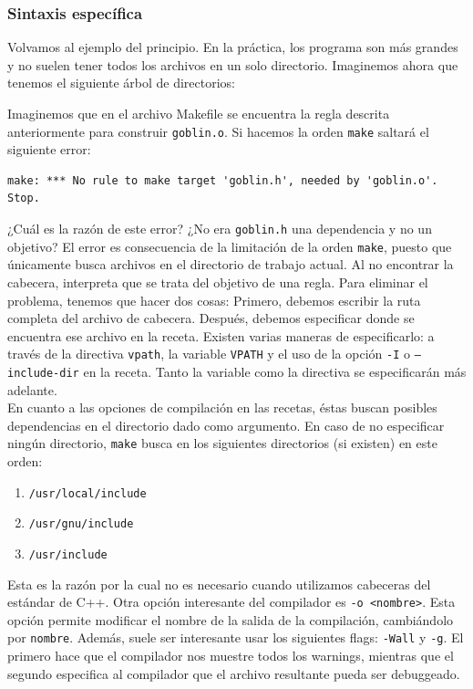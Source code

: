 \documentclass[11pt,twoside,titlepage,a4paper]{article}
\theoremstyle{definition}
\theoremstyle{plain_rojo}
\theoremstyle{remark}
\begin{document}
\subsubsection{Sintaxis específica}

Volvamos al ejemplo del principio. En la práctica, los programa son más grandes y no suelen tener todos los archivos en un solo directorio. Imaginemos ahora que tenemos el siguiente árbol de directorios:


Imaginemos que en el archivo Makefile se encuentra la regla descrita 
anteriormente para construir \texttt{goblin.o}. Si hacemos la orden 
\texttt{make} saltará el siguiente error:
\bigskip
\begin{lstlisting}
make: *** No rule to make target 'goblin.h', needed by 'goblin.o'.  Stop.
\end{lstlisting}
\bigskip
¿Cuál es la razón de este error? ¿No era \texttt{goblin.h} una dependencia y
no un objetivo? El error es consecuencia de la limitación de la orden 
\texttt{make}, puesto que únicamente busca archivos en el directorio de
trabajo actual. Al no encontrar la cabecera, interpreta que se trata del 
objetivo de una regla. Para eliminar el problema, tenemos que hacer dos cosas:
Primero, debemos escribir la ruta completa del archivo de cabecera. Después, 
debemos especificar donde se encuentra ese archivo en la receta. Existen 
varias maneras de especificarlo: a través de la directiva \texttt{vpath}, la 
variable \texttt{VPATH} y el uso de la opción \texttt{-I} o 
\texttt{--include-dir} en la receta. Tanto la variable como la directiva se 
especificarán más adelante.
\\

En cuanto a las opciones de compilación en las recetas, éstas buscan posibles 
dependencias en el directorio dado como argumento. En caso de no especificar 
ningún directorio, \texttt{make} busca en los siguientes directorios (si 
existen) en este orden: 
\begin{enumerate}[noitemsep,font={\color{rojooscuro}\bfseries}]
	\item \texttt{/usr/local/include}
	\item \texttt{/usr/gnu/include}
	\item \texttt{/usr/include}
\end{enumerate}
Esta es la razón por la cual no es necesario cuando utilizamos cabeceras del 
estándar de C++. Otra opción interesante del compilador es 
\texttt{-o <nombre>}. Esta opción permite modificar el nombre de la salida de 
la compilación, cambiándolo por \texttt{nombre}. Además, suele ser 
interesante usar los siguientes flags: \texttt{-Wall} y \texttt{-g}. El 
primero hace que el compilador nos muestre todos los warnings, mientras que 
el segundo especifica al compilador que el archivo resultante pueda ser 
debuggeado.
\\
\end{document}
